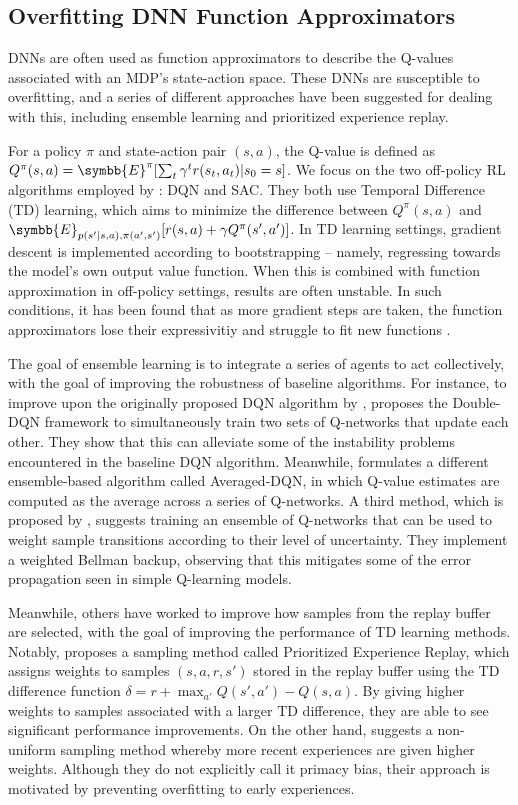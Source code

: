 \documentclass[base]{subfiles}
\begin{document}
\subsection{Overfitting DNN Function Approximators}

DNNs are often used as function approximators to describe the Q-values associated with an MDP's state-action space. 
These DNNs are susceptible to overfitting, and a series of different approaches have been suggested for dealing with this, including ensemble learning and prioritized experience replay.

For a policy $\pi$ and state-action pair $(s,a)$, the Q-value is defined as $Q^{\pi} (s, a) = \symbb{E}^{\pi} [ \sum_t \gamma^t r(s_t, a_t) | s_0 = s ]$. 
We focus on the two off-policy RL algorithms employed by \cite{kim2023}: DQN and SAC. 
They both use Temporal Difference (TD) learning, which aims to minimize the difference between $Q^{\pi}(s,a)$ and $\symbb{E}_{p(s'|s,a), \pi(a',s')} [r(s,a) + \gamma Q^{\pi} (s', a')]$. 
In TD learning settings, gradient descent is implemented according to bootstrapping -- namely, regressing towards the model's own output value function. 
When this is combined with function approximation in off-policy settings, results are often unstable.
In such conditions, it has been found that as more gradient steps are taken, the function approximators lose their expressivitiy and struggle to fit new functions \cite{kumar2021, lyle2022}. 

The goal of ensemble learning is to integrate a series of agents to act collectively, with the goal of improving the robustness of baseline algorithms.
For instance, to improve upon the originally proposed DQN algorithm by \cite{minh2015}, \cite{hasselt2016} proposes the Double-DQN framework to simultaneously train two sets of Q-networks that update each other. 
They show that this can alleviate some of the instability problems encountered in the baseline DQN algorithm.  
Meanwhile, \cite{anschel2017} formulates a different ensemble-based algorithm called Averaged-DQN, in which Q-value estimates are computed as the average across a series of Q-networks. 
A third method, which is proposed by \cite{lee2021}, suggests training an ensemble of Q-networks that can be used to weight sample transitions according to their level of uncertainty.
They implement a weighted Bellman backup, observing that this mitigates some of the error propagation seen in simple Q-learning models. 

Meanwhile, others have worked to improve how samples from the replay buffer are selected, with the goal of improving the performance of TD learning methods.
Notably, \cite{schaul2016} proposes a sampling method called Prioritized Experience Replay, which assigns weights to samples $(s, a, r, s')$ stored in the replay buffer using the TD difference function $\delta = r + \max_{a'} Q(s', a') - Q(s,a)$. 
By giving higher weights to samples associated with a larger TD difference, they are able to see significant performance improvements. 
On the other hand, \cite{wang2020} suggests a non-uniform sampling method whereby more recent experiences are given higher weights. 
Although they do not explicitly call it primacy bias, their approach is motivated by preventing overfitting to early experiences.
\end{document}
